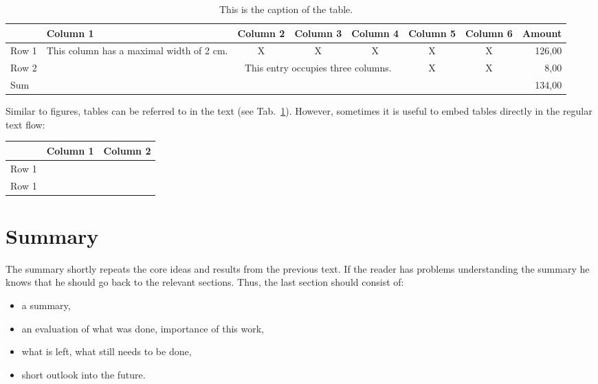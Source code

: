 \documentclass[A4,twocolumn]{article}
\begin{document}
\begin{table}

\begin{center}
\begin{tabular}{|l|p{2cm}|c|c|c|c|c|r|}
\hline
	& Column 1 & Column 2 & Column 3 & Column 4& Column 5& Column 6& 
Amount\\
\hline
Row 1 & This column has a maximal width of 2 cm.& X & X& X& X& X& 126,00\\
\hline
Row 2 & & \multicolumn{3}{p{5cm}|}{This entry occupies three columns.}& X &X 
& 8,00\\
\hline
\multicolumn{7}{|l}{Sum} &134,00\\
\hline
\end{tabular}
\end{center}

\caption{This is the caption of the table.}
\label{Tab1}

\end{table}

Similar to figures, tables can be referred to in the text (see 
Tab.~\ref{Tab1}). However, sometimes it is useful to embed tables directly in 
the regular text flow:

\begin{center}
\begin{tabular}{|c|c|c|}
\hline
	& Column 1 & Column 2 \\
\hline
Row 1 & & \\
Row 1 & & \\
\hline
\end{tabular}
\end{center}


\section{Summary}
\label{summary}

The summary shortly repeats the core ideas and results from the
previous text. If the reader has problems understanding the summary
he knows that he should go back to the relevant sections.
Thus, the last section should consist of:

\begin{itemize}
	\item a summary,
	\item an evaluation of what was done, importance of this work,
	\item what is left, what still needs to be done,
        \item short outlook into the future.
\end{itemize}
\end{document}
